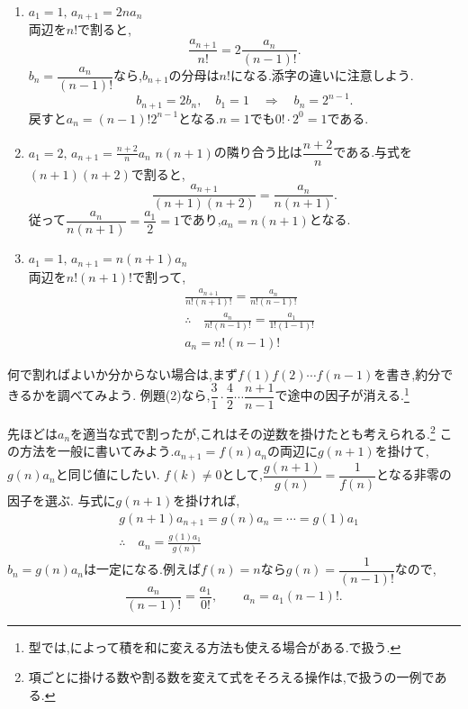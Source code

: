     \noindent{}\par\nobreak
    \begin{enumerate}[label=(\arabic*),parsep=3pt,format=\bookitemlink{example-ratio-1}{solution}{problem}]
      \item $\displaystyle a_1=1,\, a_{n+1}=2na_n$\\
            両辺を$n!$で割ると,
            \[
              \frac{a_{n+1}}{n!}=2\frac{a_n}{(n-1)!}.
            \]
            $b_n=\dfrac{a_n}{(n-1)!}$なら,$b_{n+1}$の分母は$n!$になる.添字の違いに注意しよう.
            \[
              b_{n+1}=2b_n,\quad b_1=1\quad\Longrightarrow\quad b_n=2^{n-1}.
            \]
            戻すと$a_n=(n-1)!2^{n-1}$となる.$n=1$でも$0!\cdot2^0=1$である.

      \item $\displaystyle a_1=2,\, a_{n+1}=\frac{n+2}{n}a_n$
            $n(n+1)$の隣り合う比は$\dfrac{n+2}{n}$である.与式を$(n+1)(n+2)$で割ると,
            \[
              \frac{a_{n+1}}{(n+1)(n+2)}=\frac{a_n}{n(n+1)}.
            \]
            従って$\dfrac{a_n}{n(n+1)}=\dfrac{a_1}{2}=1$であり,$a_n=n(n+1)$となる.
      \item $\displaystyle a_1=1,\, a_{n+1}=n(n+1)a_n$\\
              両辺を$n!(n+1)!$で割って,
            \begin{align*}
              &\frac{a_{n+1}}{n!(n+1)!}=\frac{a_n}{n!(n-1)!}\\
              &\therefore \quad \frac{a_n}{n!(n-1)!}=\frac{a_1}{1!(1-1)!}\\
              &a_n=n!(n-1)!
            \end{align*}
    \end{enumerate}

    何で割ればよいか分からない場合は,まず$f(1)f(2)\cdots f(n-1)$を書き,約分できるかを調べてみよう.
    例題(2)なら,$\dfrac31\cdot\dfrac42\cdots\dfrac{n+1}{n-1}$で途中の因子が消える.\footnote{型では,によって積を和に変える方法も使える場合がある.で扱う.}

\label{解釈：階比と正規化}
    先ほどは$a_n$を適当な式で割ったが,これはその逆数を掛けたとも考えられる.\footnote{項ごとに掛ける数や割る数を変えて式をそろえる操作は,で扱うの一例である.}
    この方法を一般に書いてみよう.$a_{n+1}=f(n)a_n$の両辺に$g(n+1)$を掛けて,$g(n)a_n$と同じ値にしたい.
    $f(k)\ne0$として,$\dfrac{g(n+1)}{g(n)}=\dfrac{1}{f(n)}$となる非零の因子を選ぶ.
    与式に$g(n+1)$を掛ければ,
    \begin{align*}
      &g(n+1)a_{n+1}=g(n)a_n=\cdots=g(1)a_1\\
      &\therefore \quad a_n=\frac{g(1)a_1}{g(n)}
    \end{align*}
    $b_n=g(n)a_n$は一定になる.例えば$f(n)=n$なら$g(n)=\dfrac{1}{(n-1)!}$なので,
    \[
      \frac{a_n}{(n-1)!}=\frac{a_1}{0!},\qquad a_n=a_1(n-1)!.
    \]
